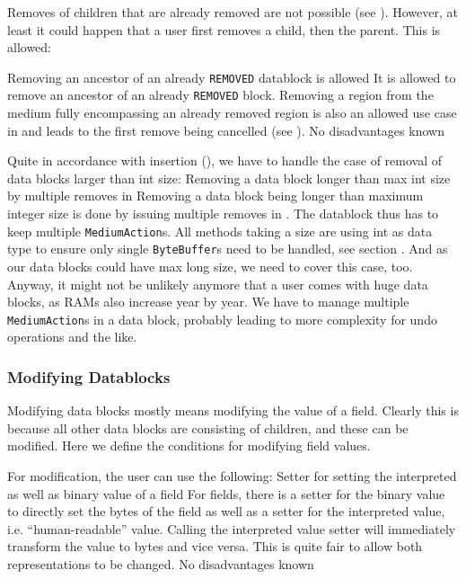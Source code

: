 Removes of children that are already removed are not possible (see ). However, at least it could happen that a user first removes a child, then the parent. This is allowed:

{%
Removing an ancestor of an already \texttt{REMOVED} datablock is allowed
}
{%
It is allowed to remove an ancestor of an already \texttt{REMOVED} block.
}
{%
Removing a region from the medium fully encompassing an already removed region is also an allowed use case in \COMPmedia{} and leads to the first remove being cancelled (see ).
}
{%
No disadvantages known
}

Quite in accordance with insertion (), we have to handle the case of removal of data blocks larger than int size:
{%
Removing a data block longer than max int size by multiple removes in \COMPmedia{}
}
{%
Removing a data block being longer than maximum integer size is done by issuing multiple removes in \COMPmedia{}. The datablock thus has to keep multiple \texttt{MediumAction}s.
}
{%
All \COMPmedia{} methods taking a size are using int as data type to ensure only single \texttt{ByteBuffer}s need to be handled, see section . And as our data blocks could have max long size, we need to cover this case, too. Anyway, it might not be unlikely anymore that a user comes with huge data blocks, as RAMs also increase year by year.
}
{%
We have to manage multiple \texttt{MediumAction}s in a data block, probably leading to more complexity for undo operations and the like.
}

\subsubsection{Modifying Datablocks}%
\label{sec:ModifyingDatablocks}%

Modifying data blocks mostly means modifying the value of a field. Clearly this is because all other data blocks are consisting of children, and these can be modified. Here we define the conditions for modifying field values.

For modification, the user can use the following:
{%
Setter for setting the interpreted as well as binary value of a field
}
{%
For fields, there is a setter for the binary value to directly set the bytes of the field as well as a setter for the interpreted value, i.e. ``human-readable'' value. Calling the interpreted value setter will immediately transform the value to bytes and vice versa.
}
{%
This is quite fair to allow both representations to be changed.
}
{%
No disadvantages known
}

